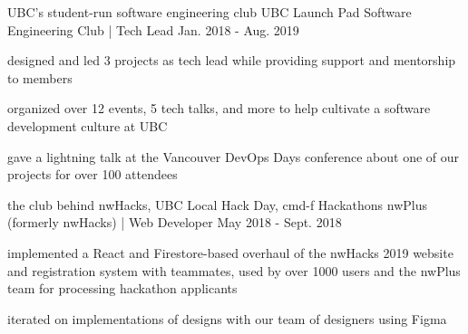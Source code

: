 \begin{cventries}

  \cventry
    {UBC's student-run software engineering club} %
    {UBC Launch Pad Software Engineering Club | Tech Lead} %
    {} %
    {Jan. 2018 - Aug. 2019} %
    {
      \begin{cvitems} %
        \item {designed and led 3 projects as tech lead while providing support and mentorship to members}
        \item {organized over 12 events, 5 tech talks, and more to help cultivate a software development culture at UBC}
        \item {gave a lightning talk at the Vancouver DevOps Days conference about one of our projects for over 100 attendees}
      \end{cvitems}
    }

  \cventry
    {the club behind nwHacks, UBC Local Hack Day, cmd-f Hackathons} %
    {nwPlus (formerly nwHacks) | Web Developer} %
    {} %
    {May 2018 - Sept. 2018} %
    {
      \begin{cvitems} %
        \item {implemented a React and Firestore-based overhaul of the nwHacks 2019 website and registration system with teammates, used by over 1000 users and the nwPlus team for processing hackathon applicants}
        \item {iterated on implementations of designs with our team of designers using Figma}
      \end{cvitems}
    }

\end{cventries}
